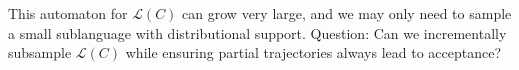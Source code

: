 \documentclass[portrait,a0b,final,a4resizeable]{a0poster}
\def\jointspacing{\vspace{0.3in}}
\begin{document}
\begin{poster}
\begin{multicols}{2}
      \hspace*{2cm}\begin{minipage}[c]{0.90\columnwidth}
This automaton for $\mathcal{L}(C)$ can grow very large, and we may only need to sample a small sublanguage with distributional support.
Question: Can we incrementally subsample $\mathcal{L}(C)$ while ensuring partial trajectories always lead to acceptance?
\vspace{2cm}
      \end{minipage}

      \jointspacing

    \end{multicols}

    \vspace{-2.2cm}
    \bottombox{

}
\end{poster}
\end{document}
